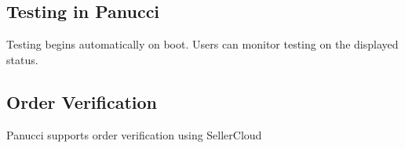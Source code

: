 \documentclass{article}
\begin{document}
\begin{flushleft}
\subsection{Testing in Panucci}
Testing begins automatically on boot.  Users can monitor testing on the displayed status.
\subsection{Order Verification}
Panucci supports order verification using SellerCloud
\end{flushleft}
\end{document}

